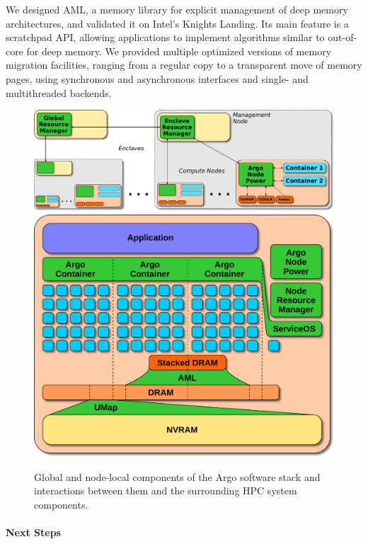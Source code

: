 We designed AML, a memory library for explicit management of deep memory
architectures, and validated it on Intel's Knights Landing. Its main
feature is a scratchpad API, allowing applications to implement algorithms
similar to out-of-core for deep memory.
We provided multiple optimized versions of memory migration facilities,
ranging from a regular copy to a transparent move of memory pages, using
synchronous and asynchronous interfaces and single- and multithreaded
backends.

\begin{figure}[h]
\centering
\includegraphics[height=.15\textheight]{projects/2.3.5-Ecosystem/2.3.5.05-Argo/argo-global}\hspace{1em}%
\includegraphics[height=.15\textheight]{projects/2.3.5-Ecosystem/2.3.5.05-Argo/argo-node}
\caption{Global and node-local components of the Argo software stack and
 interactions between them and the surrounding HPC system components.}
\end{figure}


\paragraph{Next Steps}

